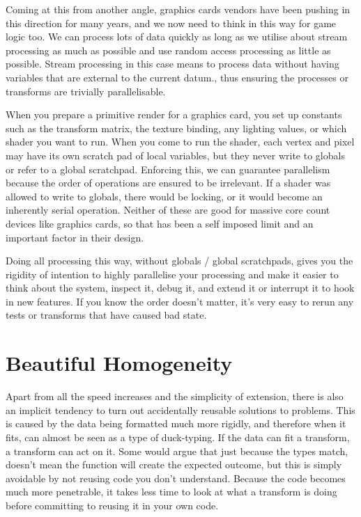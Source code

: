 Coming at this from another angle, graphics cards vendors have been pushing in
this direction for many years, and we now need to think in this way for game
logic too. We can process lots of data quickly as long as we utilise about
stream processing as much as possible and use random access processing as
little as possible. Stream processing in this case means to process data
without having variables that are external to the current datum., thus ensuring
the processes or transforms are trivially parallelisable.

When you prepare a primitive render for a graphics card, you set up constants
such as the transform matrix, the texture binding, any lighting values, or
which shader you want to run. When you come to run the shader, each vertex and
pixel may have its own scratch pad of local variables, but they never write to
globals or refer to a global scratchpad.  Enforcing this, we can guarantee
parallelism because the order of operations are ensured to be irrelevant. If a
shader was allowed to write to globals, there would be locking, or it would
become an inherently serial operation. Neither of these are good for massive
core count devices like graphics cards, so that has been a self imposed limit
and an important factor in their design.

Doing all processing this way, without globals / global scratchpads, gives you
the rigidity of intention to highly parallelise your processing and make it
easier to think about the system, inspect it, debug it, and extend it or
interrupt it to hook in new features. If you know the order doesn't matter,
it's very easy to rerun any tests or transforms that have caused bad state.

\section{Beautiful Homogeneity}

Apart from all the speed increases and the simplicity of extension, there is
also an implicit tendency to turn out accidentally reusable solutions to
problems. This is caused by the data being formatted much more rigidly, and
therefore when it fits, can almost be seen as a type of duck-typing.  If the
data can fit a transform, a transform can act on it. Some would argue that just
because the types match, doesn't mean the function will create the expected
outcome, but this is simply avoidable by not reusing code you don't understand.
Because the code becomes much more penetrable, it takes less time to look at
what a transform is doing before committing to reusing it in your own code.

